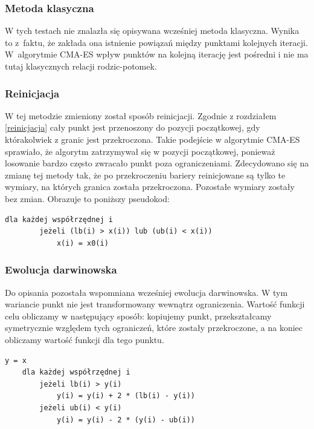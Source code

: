 \documentclass{mini}
\begin{document}
\subsubsection*{Metoda klasyczna}
W tych testach nie znalazła się opisywana wcześniej metoda klasyczna. Wynika to z~faktu, że zakłada ona istnienie powiązań między punktami kolejnych iteracji. W~algorytmie CMA-ES wpływ punktów na kolejną iterację jest pośredni i nie ma tutaj klasycznych relacji rodzic-potomek.

\subsubsection*{Reinicjacja}
W tej metodzie zmieniony został sposób reinicjacji. Zgodnie z rozdziałem \ref{reinicjacja} cały punkt jest przenoszony do pozycji początkowej, gdy którakolwiek z granic jest przekroczona. Takie podejście w algorytmie CMA-ES sprawiało, że algorytm zatrzymywał się w pozycji początkowej, ponieważ losowanie bardzo często zwracało punkt poza ograniczeniami. Zdecydowano się na zmianę tej metody tak, że po przekroczeniu bariery reinicjowane są tylko te wymiary, na których granica została przekroczona. Pozostałe wymiary zostały bez zmian. Obrazuje to poniższy pseudokod:

\begin{Verbatim}[baselinestretch=1.1]
	dla każdej współrzędnej i
		jeżeli (lb(i) > x(i)) lub (ub(i) < x(i))
			x(i) = x0(i)
\end{Verbatim}

\subsubsection*{Ewolucja darwinowska}
Do opisania pozostała wspomniana wcześniej ewolucja darwinowska. W tym wariancie punkt nie jest transformowany wewnątrz ograniczenia. Wartość funkcji celu obliczamy w następujący sposób: kopiujemy punkt, przekształcamy symetrycznie względem tych ograniczeń, które zostały przekroczone, a na koniec obliczamy wartość funkcji dla tego punktu.

\begin{Verbatim}[baselinestretch=1.1]
	y = x
	dla każdej współrzędnej i
		jeżeli lb(i) > y(i)
			y(i) = y(i) + 2 * (lb(i) - y(i))
		jeżeli ub(i) < y(i)
			y(i) = y(i) - 2 * (y(i) - ub(i))
\end{Verbatim}
\end{document}
